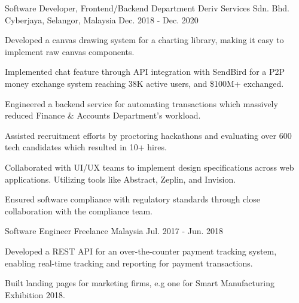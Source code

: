 \begin{cventries}
  \cventry
    {Software Developer, Frontend/Backend Department} %
    {Deriv Services Sdn. Bhd.} %
    {Cyberjaya, Selangor, Malaysia} %
    {Dec. 2018 - Dec. 2020} %
    {
      \begin{cvitems} %
        \item {Developed a canvas drawing system for a charting library, making it easy to implement raw canvas components.}
        \item {Implemented chat feature through API integration with SendBird for a P2P money exchange system reaching 38K active users, and \$100M+ exchanged.}
        \item {Engineered a backend service for automating transactions which massively reduced Finance \& Accounts Department's workload.}
        \item {Assisted recruitment efforts by proctoring hackathons and evaluating over 600 tech candidates which resulted in 10+ hires.}
        \item {Collaborated with UI/UX teams to implement design specifications across web applications. Utilizing tools like Abstract, Zeplin, and Invision.}
        \item {Ensured software compliance with regulatory standards through close collaboration with the compliance team.}
      \end{cvitems}
    }

  \cventry
    {Software Engineer} %
    {Freelance} %
    {Malaysia} %
    {Jul. 2017 - Jun. 2018} %
    {
      \begin{cvitems} %
        \item {Developed a REST API for an over-the-counter payment tracking system, enabling real-time tracking and reporting for payment transactions.}
        \item {Built landing pages for marketing firms, e.g one for Smart Manufacturing Exhibition 2018.}
      \end{cvitems}
    }

\end{cventries}
